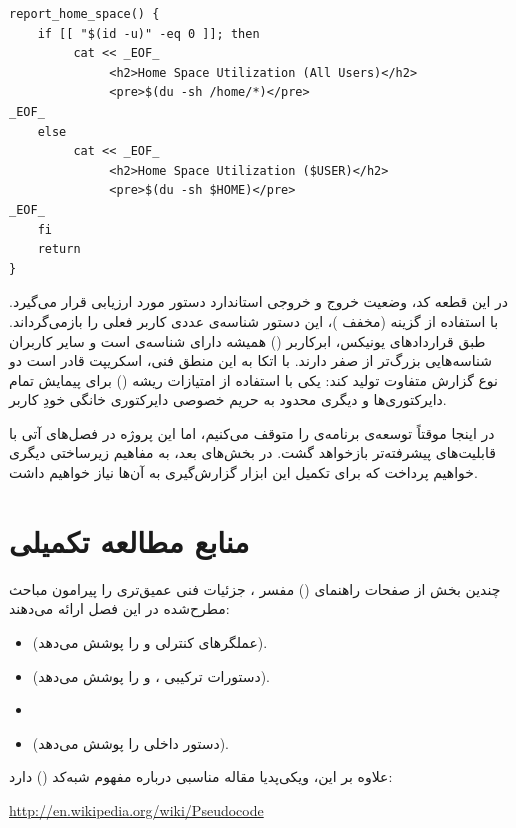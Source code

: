 \begin{latin}
\begin{lstlisting}
report_home_space() {
    if [[ "$(id -u)" -eq 0 ]]; then
         cat << _EOF_
              <h2>Home Space Utilization (All Users)</h2>
              <pre>$(du -sh /home/*)</pre>
_EOF_
    else
         cat << _EOF_
              <h2>Home Space Utilization ($USER)</h2>
              <pre>$(du -sh $HOME)</pre>
_EOF_
    fi
    return
}
\end{lstlisting}
\end{latin}

در این قطعه کد، وضعیت خروج و خروجی استاندارد دستور  مورد ارزیابی قرار می‌گیرد. با استفاده از گزینه  (مخفف )، این دستور شناسه‌ی عددی کاربر فعلی را بازمی‌گرداند. طبق قراردادهای یونیکس، ابرکاربر () همیشه دارای شناسه‌ی  است و سایر کاربران شناسه‌هایی بزرگ‌تر از صفر دارند. با اتکا به این منطق فنی، اسکریپت قادر است دو نوع گزارش متفاوت تولید کند: یکی با استفاده از امتیازات ریشه () برای پیمایش تمام دایرکتوری‌ها و دیگری محدود به حریم خصوصی دایرکتوری خانگی خودِ کاربر.

در اینجا موقتاً توسعه‌ی برنامه‌ی  را متوقف می‌کنیم، اما این پروژه در فصل‌های آتی با قابلیت‌های پیشرفته‌تر بازخواهد گشت. در بخش‌های بعد، به مفاهیم زیرساختی دیگری خواهیم پرداخت که برای تکمیل این ابزار گزارش‌گیری به آن‌ها نیاز خواهیم داشت.

\section{منابع مطالعه تکمیلی}

چندین بخش از صفحات راهنمای () مفسر ، جزئیات فنی عمیق‌تری را پیرامون مباحث مطرح‌شده در این فصل ارائه می‌دهند:

\begin{itemize}
  \item {} (عملگرهای کنترلی \cmd{||} و \cmd{\&\&} را پوشش می‌دهد).
  \item {} (دستورات ترکیبی \cmd{[[ ]]}، \cmd{(( ))} و  را پوشش می‌دهد).
  \item {}
  \item {} (دستور داخلی  را پوشش می‌دهد).
\end{itemize}

علاوه بر این، ویکی‌پدیا مقاله مناسبی درباره مفهوم شبه‌کد () دارد:

\begin{latin}
\url{http://en.wikipedia.org/wiki/Pseudocode}
\end{latin}